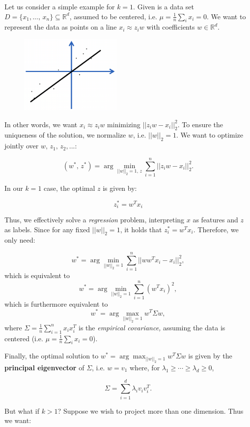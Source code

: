 \documentclass[a4paper]{extarticle}
\begin{document}
Let us consider a simple example for $k = 1$. Given is a data set $D = \{x_1,..., \, x_n\} \subseteq \mathbb{R}^d$, assumed to be centered, i.e. $\mu = \frac{1}{n} \sum_i x_i = 0$. We want to represent the data as points on a line $x_i \approx z_iw$ with coefficients $w \in \mathbb{R}^d$.

\begin{figure}[H]
    \includegraphics[width=5cm]{../images/IntroML_Fig9-1}
    \centering
\end{figure}

In other words, we want $x_i \approx z_iw$ minimizing $||z_iw - x_i||_2^2$. To ensure the uniqueness of the solution, we normalize $w$, i.e. $||w||_2 = 1$. We want to optimize jointly over $w, \, z_1, \, z_2,...$:

\[
    (w^*, \, z^*) = \arg \min_{||w||_2 = 1, \, z} \sum_{i = 1}^n ||z_iw - x_i||_2^2.
\]

In our $k = 1$ case, the optimal $z$ is given by:

\[
    z_i^* = w^Tx_i
\]

Thus, we effectively solve a \textit{regression} problem, interpreting $x$ as features and $z$ as labels. Since for any fixed $||w||_2 = 1$, it holds that $z_i^* = w^Tx_i$. Therefore, we only need:

\[
    w^* = \arg \min_{||w||_2 = 1} \sum_{i = 1}^n ||ww^Tx_i - x_i||_2^2,
\]
which is equivalent to
\[
    w^* = \arg \min_{||w||_2 = 1} \sum_{i = 1}^n (w^Tx_i)^2,
\]
which is furthermore equivalent to
\[
    w^* = \arg \max_{||w||_2 = 1} w^T\Sigma w,
\]
where $\Sigma = \frac{1}{n}\sum_{i = 1}^n x_ix_i^T$ is the \textit{empirical covariance,} assuming the data is centered (i.e. $\mu = \frac{1}{n} \sum_i x_i = 0$).

Finally, the optimal solution to $w^* = \arg \max_{||w||_2 = 1} w^T\Sigma w$ is given by the \textbf{principal eigenvector} of $\Sigma$, i.e. $w = v_1$ where, for $\lambda_1 \geq \cdots \geq \lambda_d \geq 0$,

\[
    \Sigma = \sum_{i = 1}^d \lambda_i v_i v_i^T.
\]

But what if $k > 1$? Suppose we wish to project more than one dimension. Thus we want:
\end{document}
